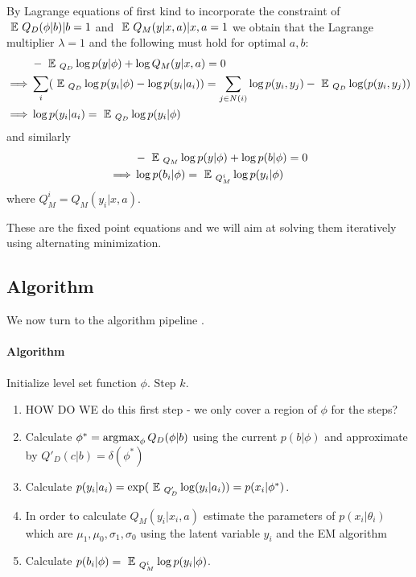 \documentclass{article} %
\begin{document}
By Lagrange equations of first kind to incorporate the constraint of $\mbox{ }\mathbb{E}\mbox{ } Q_D(\phi|b) |b = 1$ and $\mbox{ }\mathbb{E}\mbox{ } Q_M(y|x,a) |x,a = 1$  we obtain that the Lagrange multiplier $\lambda = 1$ and the following must hold for optimal $a,b$:
\begin{align*}
& -\mbox{ }\mathbb{E}\mbox{ }_{Q_D} \log p(y|\phi) + \log Q_M(y|x,a) = 0\\
\implies  &\sum_i (\mbox{ }\mathbb{E}\mbox{ }_{Q_D}\log p(y_i|\phi) - \log p(y_i|a_i)) = \sum_{j\in N(i)} \log p(y_i,y_j) - \mbox{ }\mathbb{E}\mbox{ }_{Q_D} \log(p(y_i,y_j)) \\
\implies &\log p(y_i|a_i) = \mbox{ }\mathbb{E}\mbox{ }_{Q_D} \log p(y_i|\phi) 
\end{align*}
and similarly
\begin{align*}
&- \mbox{ }\mathbb{E}\mbox{ }_{Q_M} \log p(y|\phi) + \log p(b|\phi) = 0\\
\implies &\log p(b_i|\phi) = \mbox{ }\mathbb{E}\mbox{ }_{Q^i_M} \log p(y_i|\phi)  
\end{align*}
where $Q_M^i = Q_M(y_i|x,a)$.

These are the fixed point equations and we will aim at solving them iteratively using alternating minimization. 

\subsection{Algorithm}

We now turn to the algorithm pipeline
. 
\paragraph{Algorithm}
Initialize level set function $\phi$.
Step $k$.
\begin{enumerate}
\item HOW DO WE do this first step - we only cover a region of $\phi$ for the steps?
\item Calculate $\phi^* = \operatorname*{argmax}_{\phi} Q_D(\phi|b)$ using the current $p(b|\phi)$ and approximate by $Q'_D(c|b) = \delta(\phi^*)$
\item Calculate $p(y_i|a_i) = \exp(\mbox{ }\mathbb{E}\mbox{ }_{Q'_D} \log (y_i|a_i))= p(x_i|\phi^*)$.
\item In order to calculate $Q_M(y_i|x_i,a)$ estimate the parameters of $p(x_i|\theta_i)$ which are $\mu_1,\mu_0,\sigma_1,\sigma_0$ using the latent variable $y_i$ and the EM algorithm
\item Calculate $p(b_i|\phi) = \mbox{ }\mathbb{E}\mbox{ }_{Q_M^i} \log p(y_i|\phi)$.
\end{enumerate} 
\end{document}
